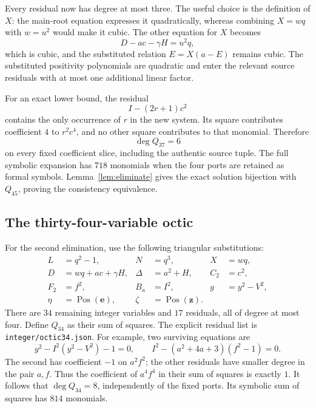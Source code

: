 \documentclass[11pt,a4paper]{article}
\theoremstyle{definition}
\theoremstyle{remark}
\newcommand{\pos}{\operatorname{Pos}}
\newcommand{\sourcepath}[1]{\texttt{\small #1}}
\begin{document}
Every residual now has degree at most three. The useful choice is the
definition of \(X\): the main-root equation expresses it quadratically,
whereas combining \(X=wq\) with \(w=u^2\) would make it cubic.
The other equation for \(X\) becomes
\[
 D-ac-\gamma H=u^2q,
\]
which is cubic, and the substituted relation \(E=X(a-E)\) remains cubic.
The substituted positivity polynomials are quadratic and enter the
relevant source residuals with at most one additional linear factor.

For an exact lower bound, the residual
\[
 I-(2r+1)c^2
\]
contains the only occurrence of \(r\) in the new system. Its square
contributes coefficient \(4\) to \(r^2c^4\), and no other square
contributes to that monomial. Therefore
\[
 \deg Q_{37}=6
\]
on every fixed coefficient slice, including the authentic source tuple.
The full symbolic expansion has \(718\) monomials when the four ports
are retained as formal symbols. Lemma~\ref{lem:eliminate} gives the
exact solution bijection with \(Q_{45}\), proving the consistency
equivalence.

\subsection{The thirty-four-variable octic}

For the second elimination, use the following triangular substitutions:
\begin{equation}
 \begin{aligned}
 L&=q^2-1,& N&=q^3,& X&=wq,\\
 D&=wq+ac+\gamma H,& \Delta&=a^2+H,& C_2&=c^2,\\
 F_2&=f^2,& B_a&=I^2,& g&=y^2-V^2,\\
 \eta&=\pos(\boldsymbol e),&
 \zeta&=\pos(\boldsymbol z).
 \end{aligned}                              \label{eq:elim34}
\end{equation}
There are \(34\) remaining integer variables and \(17\) residuals,
all of degree at most four. Define \(Q_{34}\) as their sum of squares.
The explicit residual list is \sourcepath{integer/octic34.json}.
For example, two surviving equations are
\[
 y^2-I^2(y^2-V^2)-1=0,\qquad
 I^2-(a^2+4a+3)(f^2-1)=0.
\]
The second has coefficient \(-1\) on \(a^2f^2\); the other residuals
have smaller degree in the pair \(a,f\). Thus the coefficient of
\(a^4f^4\) in their sum of squares is exactly \(1\).
It follows that \(\deg Q_{34}=8\), independently of the fixed ports.
Its symbolic sum of squares has \(814\) monomials.
\end{document}
